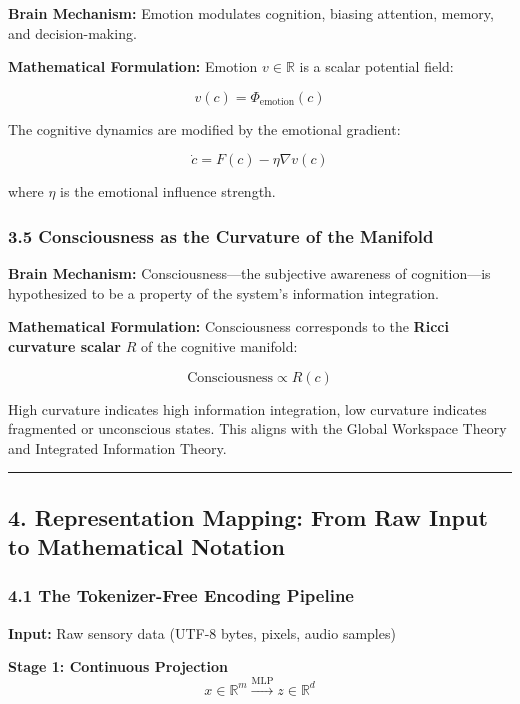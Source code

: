 \documentclass[
  11pt,
  a4paper,
]{article}
\begin{document}
\textbf{Brain Mechanism:} Emotion modulates cognition, biasing
attention, memory, and decision-making.

\textbf{Mathematical Formulation:} Emotion \(v \in \mathbb{R}\) is a
scalar potential field:

\[v(c) = \Phi_{\text{emotion}}(c)\]

The cognitive dynamics are modified by the emotional gradient:

\[\dot{c} = F(c) - \eta \nabla v(c)\]

where \(\eta\) is the emotional influence strength.

\subsubsection{3.5 Consciousness as the Curvature of the
Manifold}\label{consciousness-as-the-curvature-of-the-manifold}

\textbf{Brain Mechanism:} Consciousness---the subjective awareness of
cognition---is hypothesized to be a property of the system's information
integration.

\textbf{Mathematical Formulation:} Consciousness corresponds to the
\textbf{Ricci curvature scalar} \(R\) of the cognitive manifold:

\[\text{Consciousness} \propto R(c)\]

High curvature indicates high information integration, low curvature
indicates fragmented or unconscious states. This aligns with the Global
Workspace Theory and Integrated Information Theory.

\begin{center}\rule{0.5\linewidth}{0.5pt}\end{center}

\subsection{4. Representation Mapping: From Raw Input to Mathematical
Notation}\label{representation-mapping-from-raw-input-to-mathematical-notation}

\subsubsection{4.1 The Tokenizer-Free Encoding
Pipeline}\label{the-tokenizer-free-encoding-pipeline}

\textbf{Input:} Raw sensory data (UTF-8 bytes, pixels, audio samples)

\textbf{Stage 1: Continuous Projection}
\[x \in \mathbb{R}^m \xrightarrow{\text{MLP}} z \in \mathbb{R}^d\]
\end{document}
